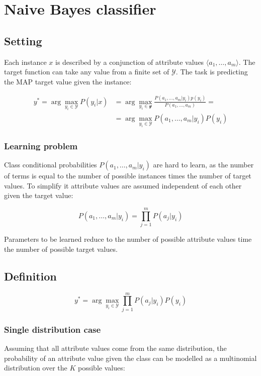 \chapter{Naive Bayes classifier}

\section{Setting}
Each instance $x$ is described by a conjunction of attribute values $\langle a_1, \dots, a_m\rangle$.
The target function can take any value from a finite set of $\mathcal{Y}$.
The task is predicting the MAP target value given the instance:

\begin{align*}
	y^* = \arg\max\limits_{y_i\in\mathcal{Y}}P(y_i|x) &=\arg\max\limits_{y_i\in\mathcal{y}}\frac{P(a_1, \dots, a_m|y_i)p(y_i)}{P(a_1, \dots, a_m)}=\\
																										&=\arg\max\limits_{y_i\in\mathcal{Y}}P(a_1, \dots, a_m|y_i)P(y_i)
\end{align*}

	\subsection{Learning problem}
	Class conditional probabilities $P(a_1, \dots, a_m|y_i)$ are hard to learn, as the number of terms is equal to the number of possible instances times the number of target values.
	To simplify it attribute values are assumed independent of each other given the target value:

	$$P(a_1, \dots, a_m|y_i) = \prod\limits_{j=1}^mP(a_j|y_i)$$

	Parameters to be learned reduce to the number of possible attribute values time the number of possible target values.

\section{Definition}
$$y^* = \arg\max\limits_{y_i\in\mathcal{Y}}\prod\limits_{j=1}^mP(a_j|y_i)P(y_i)$$

	\subsection{Single distribution case}
	Assuming that all attribute values come from the same distribution, the probability of an attribute value given the class can be modelled as a multinomial distribution over the $K$ possible values:

